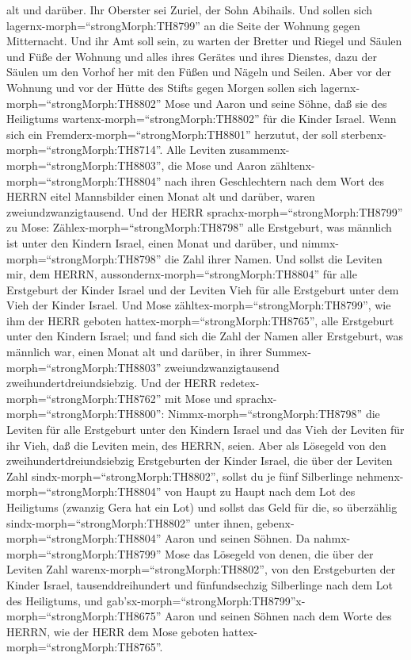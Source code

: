 alt und darüber.  Ihr Oberster sei Zuriel, der Sohn
Abihails. Und sollen sich lagernx-morph=``strongMorph:TH8799'' an die
Seite der Wohnung gegen Mitternacht.  Und ihr Amt soll
sein, zu warten der Bretter und Riegel und Säulen und Füße der Wohnung
und alles ihres Gerätes und ihres Dienstes,  dazu der
Säulen um den Vorhof her mit den Füßen und Nägeln und Seilen.
 Aber vor der Wohnung und vor der Hütte des Stifts gegen
Morgen sollen sich lagernx-morph=``strongMorph:TH8802'' Mose und Aaron
und seine Söhne, daß sie des Heiligtums
wartenx-morph=``strongMorph:TH8802'' für die Kinder Israel. Wenn sich
ein Fremderx-morph=``strongMorph:TH8801'' herzutut, der soll
sterbenx-morph=``strongMorph:TH8714''.  Alle Leviten
zusammenx-morph=``strongMorph:TH8803'', die Mose und Aaron
zähltenx-morph=``strongMorph:TH8804'' nach ihren Geschlechtern nach dem
Wort des HERRN eitel Mannsbilder einen Monat alt und darüber, waren
zweiundzwanzigtausend.  Und der HERR
sprachx-morph=``strongMorph:TH8799'' zu Mose:
Zählex-morph=``strongMorph:TH8798'' alle Erstgeburt, was männlich ist
unter den Kindern Israel, einen Monat und darüber, und
nimmx-morph=``strongMorph:TH8798'' die Zahl ihrer Namen. 
Und sollst die Leviten mir, dem HERRN,
aussondernx-morph=``strongMorph:TH8804'' für alle Erstgeburt der Kinder
Israel und der Leviten Vieh für alle Erstgeburt unter dem Vieh der
Kinder Israel.  Und Mose
zähltex-morph=``strongMorph:TH8799'', wie ihm der HERR geboten
hattex-morph=``strongMorph:TH8765'', alle Erstgeburt unter den Kindern
Israel;  und fand sich die Zahl der Namen aller Erstgeburt,
was männlich war, einen Monat alt und darüber, in ihrer
Summex-morph=``strongMorph:TH8803'' zweiundzwanzigtausend
zweihundertdreiundsiebzig.  Und der HERR
redetex-morph=``strongMorph:TH8762'' mit Mose und
sprachx-morph=``strongMorph:TH8800'': 
Nimmx-morph=``strongMorph:TH8798'' die Leviten für alle Erstgeburt unter
den Kindern Israel und das Vieh der Leviten für ihr Vieh, daß die
Leviten mein, des HERRN, seien.  Aber als Lösegeld von den
zweihundertdreiundsiebzig Erstgeburten der Kinder Israel, die über der
Leviten Zahl sindx-morph=``strongMorph:TH8802'',  sollst du
je fünf Silberlinge nehmenx-morph=``strongMorph:TH8804'' von Haupt zu
Haupt nach dem Lot des Heiligtums (zwanzig Gera hat ein Lot)
 und sollst das Geld für die, so überzählig
sindx-morph=``strongMorph:TH8802'' unter ihnen,
gebenx-morph=``strongMorph:TH8804'' Aaron und seinen Söhnen.
 Da nahmx-morph=``strongMorph:TH8799'' Mose das Lösegeld
von denen, die über der Leviten Zahl
warenx-morph=``strongMorph:TH8802'',  von den Erstgeburten
der Kinder Israel, tausenddreihundert und fünfundsechzig Silberlinge
nach dem Lot des Heiligtums,  und
gab'sx-morph=``strongMorph:TH8799''x-morph=``strongMorph:TH8675'' Aaron
und seinen Söhnen nach dem Worte des HERRN, wie der HERR dem Mose
geboten hattex-morph=``strongMorph:TH8765''.


